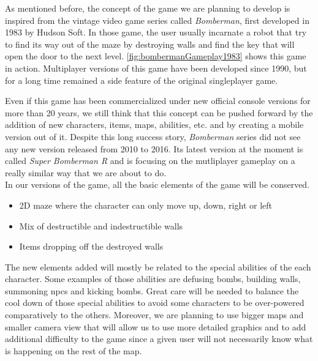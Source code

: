 
As mentioned before, the concept of the game we are planning to develop is inspired from the vintage video game series called \textit{Bomberman}, first developed in 1983 by Hudson Soft. In those game, the user usually incarnate a robot that try to find its way out of the maze by destroying walls and find the key that will open the door to the next level. \autoref{fig:bombermanGameplay1983} shows this game in action. Multiplayer versions of this game have been developed since 1990, but for a long time remained a side feature of the original singleplayer game. \cite{wiki:bomberman} \\


Even if this game has been commercialized under new official console versions for more than 20 years, we still think that this concept can be pushed forward by the addition of new characters, items, maps, abilities, etc. and by creating a mobile version out of it. Despite this long success story, \textit{Bomberman} series did not see any new version released from 2010 to 2016. Its latest version at the moment is called \textit{Super Bomberman R} and is focusing on the mutliplayer gameplay on a really similar way that we are about to do. \\

In our versions of the game, all the basic elements of the game will be conserved.
\begin{itemize}
  \item 2D maze where the character can only move up, down, right or left
  \item Mix of destructible and indestructible walls
  \item Items dropping off the destroyed walls
\end{itemize}
The new elements added will mostly be related to the special abilities of the each character. Some examples of those abilities are defusing bombs, building walls, summoning \glspl{npc} and kicking bombs. Great care will be needed to balance the cool down of those special abilities to avoid some characters to be over-powered comparatively to the others. Moreover, we are planning to use bigger maps and smaller camera view that will allow us to use more detailed graphics and to add additional difficulty to the game since a given user will not necessarily know what is happening on the rest of the map. \\

